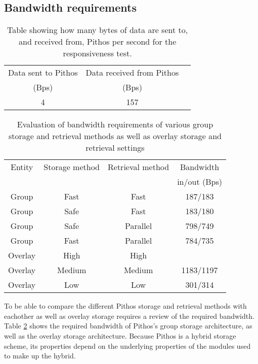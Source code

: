 \subsection{Bandwidth requirements}
\label{bandwidth_requirements}

\begin{table}[htbp]
\centering
\begin{tabular}{|c|c|c|}
\hline
Data sent to Pithos   & Data received from Pithos\\
 (Bps)                &          (Bps)           \\
\hline
        4             &          157             \\
\hline
\end{tabular}
\caption{Table showing how many bytes of data are sent to, and received from, Pithos per second for the responsiveness test.}
\label{tab_higher_data_results_resp}
\end{table}

\begin{table}[htbp]
\centering
\begin{tabular}{|c|c|c|c|}
\hline
Entity & Storage method & Retrieval method     & Bandwidth\\
       &                &                      & in/out (Bps)\\
\hline
Group   &   Fast        &   Fast               &   187/183\\
Group   &   Safe        &   Fast               &   183/180\\
Group   &   Safe        &   Parallel           &   798/749\\
Group   &   Fast        &   Parallel           &   784/735\\
\hline
Overlay &   High        &   High               &           \\
Overlay &   Medium      &   Medium             &  1183/1197\\
Overlay &   Low         &   Low                &  301/314  \\
\hline
\end{tabular}
\caption{Evaluation of bandwidth requirements of various group storage and retrieval methods as well as overlay storage and retrieval settings}
\label{tab_bandwidth_results}
\end{table}

To be able to compare the different Pithos storage and retrieval methods with eachother as well as overlay storage requires a review of the required bandwidth. Table \ref{tab_bandwidth_results} shows the required bandwidth of Pithos's group storage architecture, as well as the overlay storage architecture. Because Pithos is a hybrid storage scheme, its properties depend on the underlying properties of the modules used to make up the hybrid.

